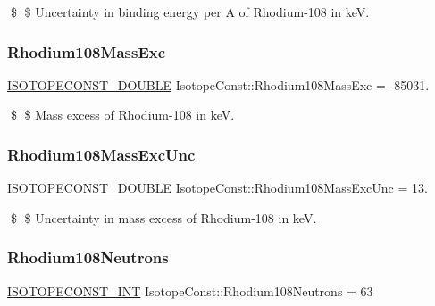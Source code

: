 \$ \$ Uncertainty in binding energy per A of Rhodium-\/108 in keV. \mbox{\label{group___isotope_const-_rhodium-_rh108_ga2a0e3df50c30e365fadfd19e0c9fe13a}} 
\subsubsection{\texorpdfstring{Rhodium108\+Mass\+Exc}{Rhodium108MassExc}}
{\footnotesize\ttfamily \mbox{\hyperlink{group___isotope_const-_macros_ga8f45a7272ce02c0b4c65c44636ed719a}{I\+S\+O\+T\+O\+P\+E\+C\+O\+N\+S\+T\+\_\+\+D\+O\+U\+B\+LE}} Isotope\+Const\+::\+Rhodium108\+Mass\+Exc = -\/85031.}

\$ \$ Mass excess of Rhodium-\/108 in keV. \mbox{\label{group___isotope_const-_rhodium-_rh108_ga1e715a1ac77df413a427338ef7fdb6e5}} 
\subsubsection{\texorpdfstring{Rhodium108\+Mass\+Exc\+Unc}{Rhodium108MassExcUnc}}
{\footnotesize\ttfamily \mbox{\hyperlink{group___isotope_const-_macros_ga8f45a7272ce02c0b4c65c44636ed719a}{I\+S\+O\+T\+O\+P\+E\+C\+O\+N\+S\+T\+\_\+\+D\+O\+U\+B\+LE}} Isotope\+Const\+::\+Rhodium108\+Mass\+Exc\+Unc = 13.}

\$ \$ Uncertainty in mass excess of Rhodium-\/108 in keV. \mbox{\label{group___isotope_const-_rhodium-_rh108_gaa0fa457bb397a812bdfd349813702d45}} 
\subsubsection{\texorpdfstring{Rhodium108\+Neutrons}{Rhodium108Neutrons}}
{\footnotesize\ttfamily \mbox{\hyperlink{group___isotope_const-_macros_ga5f18360b3e99483a35c32d789e62621c}{I\+S\+O\+T\+O\+P\+E\+C\+O\+N\+S\+T\+\_\+\+I\+NT}} Isotope\+Const\+::\+Rhodium108\+Neutrons = 63}

